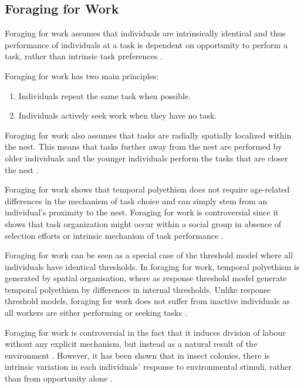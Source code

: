 \subsection{Foraging for Work}

Foraging for work assumes that individuals are intrinsically identical and thus performance of individuals at a task is dependent on opportunity to perform a task, rather than intrinsic task preferences \cite{franks1994foraging}.

Foraging for work has two main principles:
\begin{enumerate}
	\item Individuals repeat the same task when possible.
	\item Individuals actively seek work when they have no task.
\end{enumerate}


Foraging for work also assumes that tasks are radially spatially localized within the nest. This means that  tasks further away from the nest are performed by older individuals and the younger individuals perform the tasks that are closer the nest \cite{tofts1993algorithms}.

Foraging for work shows that temporal polyethism does not require age-related differences in the mechanism of task choice and can simply stem from an individual's proximity to the nest. Foraging for work is controversial since it shows that task organization might occur within a social group in absence of selection efforts or intrinsic mechanism of task performance \cite{franks1994foraging}. 

Foraging for work can be seen as a special case of the threshold model where all individuals have identical thresholds. In foraging for work, temporal polyethism is generated by spatial organisation, where as response threshold model generate temporal polyethism by differences in internal thresholds. Unlike response threshold models, foraging for work does not suffer from inactive individuals as all workers are either performing or seeking tasks \cite{beshers2001models}.

Foraging for work is controversial in the fact that it induces division of labour without any explicit mechanism, but instead as a natural result of the environment \cite{beshers2001models}. However, it has been shown that in insect colonies, there is intrinsic variation in each individuals' response to environmental  stimuli, rather than from opportunity alone \cite{julian1999undertaking}.

